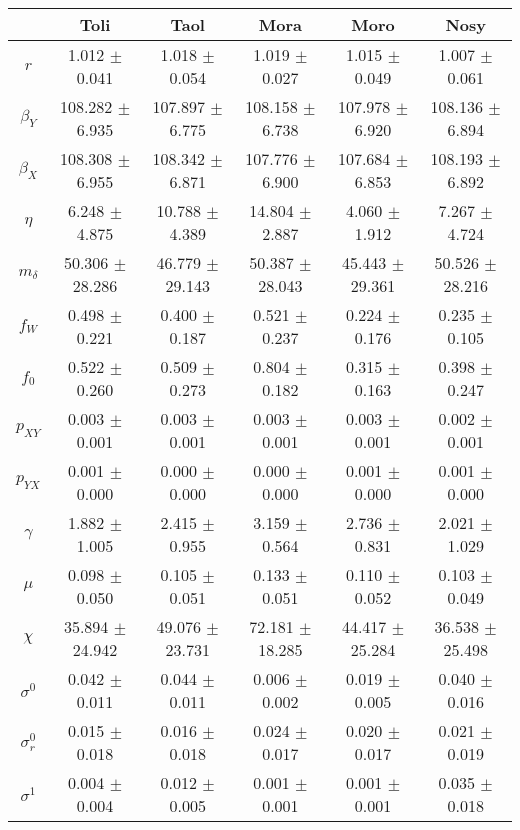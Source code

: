 \begin{sidewaystable}
\centering
\begin{tabular}{cccccc}
 & {\bf Toli} & {\bf Taol} & {\bf Mora} & {\bf Moro} & {\bf Nosy} \\
\hline\hline
{\bf $r$} & 1.012 $\pm$ 0.041 & 1.018 $\pm$ 0.054 & 1.019 $\pm$ 0.027 & 1.015 $\pm$ 0.049 & 1.007 $\pm$ 0.061 \\
{\bf $\beta_Y$} & 108.282 $\pm$ 6.935 & 107.897 $\pm$ 6.775 & 108.158 $\pm$ 6.738 & 107.978 $\pm$ 6.920 & 108.136 $\pm$ 6.894 \\
{\bf $\beta_X$} & 108.308 $\pm$ 6.955 & 108.342 $\pm$ 6.871 & 107.776 $\pm$ 6.900 & 107.684 $\pm$ 6.853 & 108.193 $\pm$ 6.892 \\
{\bf $\eta$} & 6.248 $\pm$ 4.875 & 10.788 $\pm$ 4.389 & 14.804 $\pm$ 2.887 & 4.060 $\pm$ 1.912 & 7.267 $\pm$ 4.724 \\
{\bf $m_{\delta}$} & 50.306 $\pm$ 28.286 & 46.779 $\pm$ 29.143 & 50.387 $\pm$ 28.043 & 45.443 $\pm$ 29.361 & 50.526 $\pm$ 28.216 \\
{\bf $f_W$} & 0.498 $\pm$ 0.221 & 0.400 $\pm$ 0.187 & 0.521 $\pm$ 0.237 & 0.224 $\pm$ 0.176 & 0.235 $\pm$ 0.105 \\
{\bf $f_0$} & 0.522 $\pm$ 0.260 & 0.509 $\pm$ 0.273 & 0.804 $\pm$ 0.182 & 0.315 $\pm$ 0.163 & 0.398 $\pm$ 0.247 \\
{\bf $p_{XY}$} & 0.003 $\pm$ 0.001 & 0.003 $\pm$ 0.001 & 0.003 $\pm$ 0.001 & 0.003 $\pm$ 0.001 & 0.002 $\pm$ 0.001 \\
{\bf $p_{YX}$} & 0.001 $\pm$ 0.000 & 0.000 $\pm$ 0.000 & 0.000 $\pm$ 0.000 & 0.001 $\pm$ 0.000 & 0.001 $\pm$ 0.000 \\
{\bf $\gamma$} & 1.882 $\pm$ 1.005 & 2.415 $\pm$ 0.955 & 3.159 $\pm$ 0.564 & 2.736 $\pm$ 0.831 & 2.021 $\pm$ 1.029 \\
{\bf $\mu$} & 0.098 $\pm$ 0.050 & 0.105 $\pm$ 0.051 & 0.133 $\pm$ 0.051 & 0.110 $\pm$ 0.052 & 0.103 $\pm$ 0.049 \\
{\bf $\chi$} & 35.894 $\pm$ 24.942 & 49.076 $\pm$ 23.731 & 72.181 $\pm$ 18.285 & 44.417 $\pm$ 25.284 & 36.538 $\pm$ 25.498 \\
{\bf $\sigma^0$} & 0.042 $\pm$ 0.011 & 0.044 $\pm$ 0.011 & 0.006 $\pm$ 0.002 & 0.019 $\pm$ 0.005 & 0.040 $\pm$ 0.016 \\
{\bf $\sigma^0_r$} & 0.015 $\pm$ 0.018 & 0.016 $\pm$ 0.018 & 0.024 $\pm$ 0.017 & 0.020 $\pm$ 0.017 & 0.021 $\pm$ 0.019 \\
{\bf $\sigma^1$} & 0.004 $\pm$ 0.004 & 0.012 $\pm$ 0.005 & 0.001 $\pm$ 0.001 & 0.001 $\pm$ 0.001 & 0.035 $\pm$ 0.018 \\

\end{tabular}
\end{sidewaystable}
